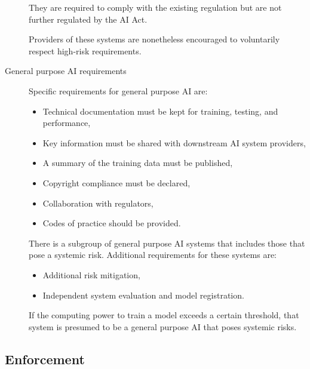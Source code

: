 \begin{description}
        They are required to comply with the existing regulation but are not further regulated by the AI Act.

        \begin{remark}
            Providers of these systems are nonetheless encouraged to voluntarily respect high-risk requirements.
        \end{remark}

    \item[General purpose AI requirements] 
        Specific requirements for general purpose AI are:
        \begin{itemize}
            \item Technical documentation must be kept for training, testing, and performance,
            \item Key information must be shared with downstream AI system providers,
            \item A summary of the training data must be published,
            \item Copyright compliance must be declared,
            \item Collaboration with regulators,
            \item Codes of practice should be provided.
        \end{itemize}

        \begin{remark}
            There is a subgroup of general purpose AI systems that includes those that pose a systemic risk. Additional requirements for these systems are:
            \begin{itemize}
                \item Additional risk mitigation,
                \item Independent system evaluation and model registration.
            \end{itemize}
        \end{remark}

        \begin{remark}
            If the computing power to train a model exceeds a certain threshold, that system is presumed to be a general purpose AI that poses systemic risks.
        \end{remark}
\end{description}


\subsection{Enforcement}

